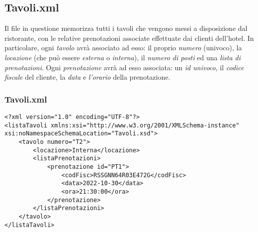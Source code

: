 \documentclass [a4paper, 12pt]{book}
\begin{document}
\medskip

\subsection{Tavoli.xml}
Il file in questione memorizza tutti i tavoli che vengono messi a disposizione dal ristorante, con le relative prenotazioni associate effettuate dai clienti dell'hotel. In particolare, ogni \textit{tavolo} avrà associato ad esso: il proprio \textit{numero} (univoco), la \textit{locazione} (che può essere \textit{esterna} o \textit{interna}), il \textit{numero di posti} ed una \textit{lista di prenotazioni}. Ogni \textit{prenotazione} avrà ad esso associata: un \textit{id univoco}, il \textit{codice fiscale} del cliente, la \textit{data} e \textit{l'orario} della prenotazione.
\subsubsection{Tavoli.xml}
\begin{lstlisting}[style=XML]
<?xml version="1.0" encoding="UTF-8"?>
<listaTavoli xmlns:xsi="http://www.w3.org/2001/XMLSchema-instance" xsi:noNamespaceSchemaLocation="Tavoli.xsd">
    <tavolo numero="T2">
        <locazione>Interna</locazione>
        <listaPrenotazioni>
            <prenotazione id="PT1">
                <codFisc>RSSGNN64R03E472G</codFisc>
                <data>2022-10-30</data>
                <ora>21:30:00</ora>
            </prenotazione>
        </listaPrenotazioni>
    </tavolo>
</listaTavoli>
\end{lstlisting}
\end{document}
